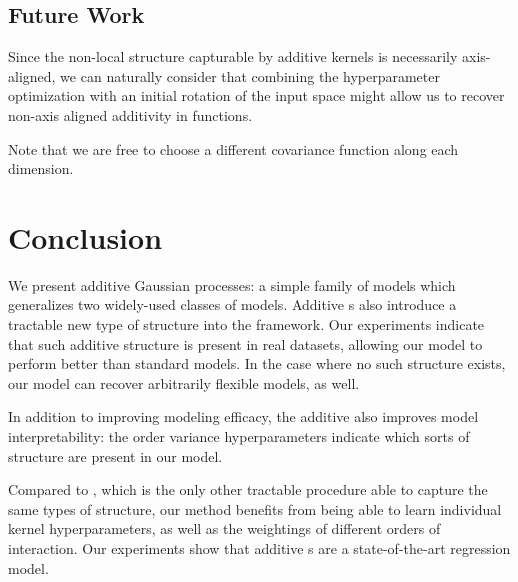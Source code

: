 \subsection{Future Work}
Since the non-local structure capturable by additive kernels is necessarily axis-aligned, we can naturally consider that combining the hyperparameter optimization with an initial rotation of the input space might allow us to recover non-axis aligned additivity in functions.

Note that we are free to choose a different covariance function along each dimension.


\section{Conclusion}

We present additive Gaussian processes: a simple family of models which generalizes two widely-used classes of models.
Additive \gp{}s also introduce a tractable new type of structure into the \gp{} framework.
Our experiments indicate that such additive structure is present in real datasets, allowing our model to perform better than standard \gp{} models.
In the case where no such structure exists, our model can recover arbitrarily flexible models, as well.

In addition to improving modeling efficacy, the additive \gp{} also improves model interpretability:  the order variance hyperparameters indicate which sorts of structure are present in our model.

Compared to \HKL{}, which is the only other tractable procedure able to capture the same types of structure, our method benefits from being able to learn individual kernel hyperparameters, as well as the weightings of different orders of interaction.
Our experiments show that additive \gp{}s are a state-of-the-art regression model.



\outbpdocument{


}







